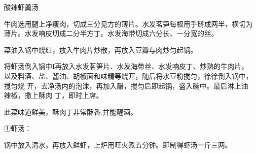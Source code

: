 \begin{recipe}{酸辣虾羹汤}

\ingredients


\preparation

\step 牛肉选用腿上净瘦肉，切成三分见方的薄片。水发茗笋每根用手掰成两半，横切为
薄片。水发响皮切成二分半方丁。水发海带切成六分长、一分宽的丝。

\step 菜油入锅中烧红，放入牛肉片炒散，再放入豆瓣与肉炒匀起锅。

\step 将虾汤倒入锅中I再放入水发茗笋片、水发海带丝、水发响皮丁、炒熟的牛肉片，
以及料酒、盐、酱油、胡椒面和味精等烧开，随后将水豆粉搅匀，徐徐倒入锅中，搅匀烧
开，去净汤内的泡沫，再加入醋，搅匀后即起锅，盛入碗中。最后淋上油辣椒，撒上酥肉
丁，即时上席。

\features

此菜味道鲜美，酥肉丁非常酥香.并能醒酒。

①虾汤：

\ingredients


\preparation

锅中放入清水，再放入鲜虾，上炉用旺火煮五分钟。即制得虾汤一斤三两。

\end{recipe}

